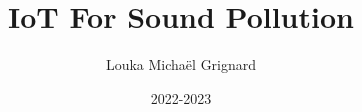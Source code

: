 
 
\def\vubtypeofwork{Bachelor thesis}

\def\vubprogram{Bachelor of Science in Engineering Technology}


\def\vubprofile{Electronics-ICT - networks}

\def\vubpretitle{\vubtypeofwork\\ \vubprogram:\\ \vubprofile}

\title{IoT For Sound Pollution} 

\def\vubsubtitle{Sound Level Meter}

\author{Louka Michaël Grignard} %

\date{2022-2023}

